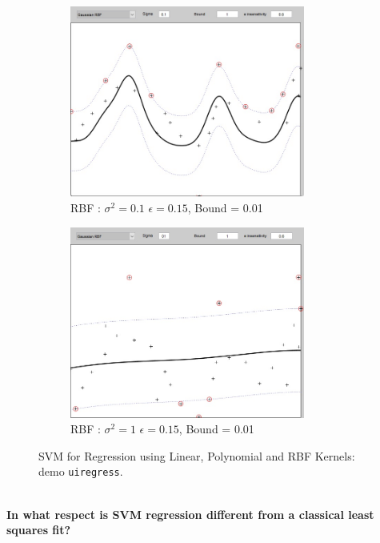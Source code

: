 \begin{figure}[ht]
\begin{subfigure}[b]{0.35\textwidth}
		\includegraphics[width = 0.85\textwidth]{Exercise2/Report/Ex2.1_RBF_sig=0.1_E=1_B=0.6}
		\caption{RBF : $\sigma^2 = 0.1$ $\epsilon = 0.15$, Bound = 0.01 }\label{fig:RBF_sig=0.1_E=1_B=0.6}
	\end{subfigure}%
	\begin{subfigure}[b]{0.35\textwidth}
		\centering
		\captionsetup{width=0.8\linewidth}
		\includegraphics[width = 0.85\textwidth]{Exercise2/Report/Ex2.1_RBF_sig=1_E=1_B=0.6}
		\caption{RBF : $\sigma^2 = 1$ $\epsilon = 0.15$, Bound = 0.01 }\label{fig:RBF_sig=1_E=1_B=0.6}
	\end{subfigure}
	\caption{SVM for Regression using Linear, Polynomial and RBF Kernels: demo \texttt{uiregress}. }
	\label{fig:uiregress_Kernels}
\end{figure}\\
\textbf{In what respect is SVM regression different from a classical least squares fit?}


